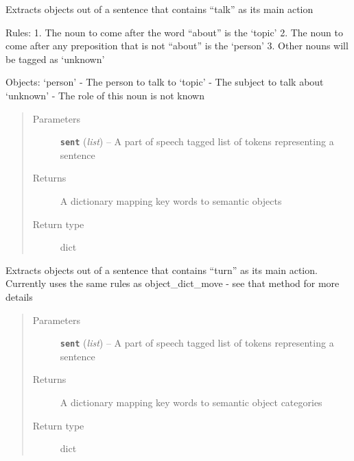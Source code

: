 \documentclass[letterpaper,10pt,english]{sphinxmanual}
\begin{document}

\begin{fulllineitems}
\label{extractor:interpreter.extractor.object_dict_talk}
Extracts objects out of a sentence that contains ``talk'' as its main action

Rules:
1. The noun to come after the word ``about'' is the `topic'
2. The noun to come after any preposition that is not ``about'' is the `person'
3. Other nouns will be tagged as `unknown'

Objects:
`person' - The person to talk to
`topic' - The subject to talk about
`unknown' - The role of this noun is not known
\begin{quote}\begin{description}
\item[{Parameters}] \leavevmode
\textbf{\texttt{sent}} (\emph{list}) -- A part of speech tagged list of tokens representing a sentence

\item[{Returns}] \leavevmode
A dictionary mapping key words to semantic objects

\item[{Return type}] \leavevmode
dict

\end{description}\end{quote}

\end{fulllineitems}


\begin{fulllineitems}
\label{extractor:interpreter.extractor.object_dict_turn}
Extracts objects out of a sentence that contains ``turn'' as its main action. Currently uses the same rules as object\_dict\_move - see that method for more details
\begin{quote}\begin{description}
\item[{Parameters}] \leavevmode
\textbf{\texttt{sent}} (\emph{list}) -- A part of speech tagged list of tokens representing a sentence

\item[{Returns}] \leavevmode
A dictionary mapping key words to semantic object categories

\item[{Return type}] \leavevmode
dict

\end{description}\end{quote}

\end{fulllineitems}
\end{document}
